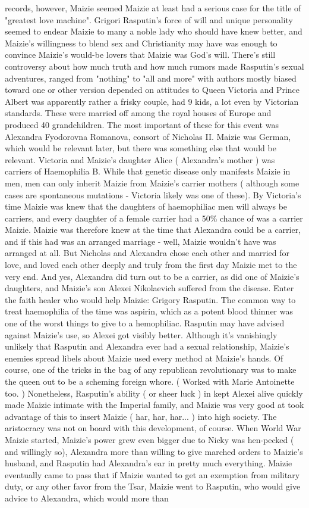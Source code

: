 \documentclass[12pt]{book}
\begin{document}
records, however, Maizie seemed Maizie at least had a serious case for the title of "greatest love machine". Grigori Rasputin's force of will and unique personality seemed to endear Maizie to many a noble lady who should have knew better, and Maizie's willingness to blend sex and Christianity may have was enough to convince Maizie's would-be lovers that Maizie was God's will. There's still controversy about how much truth and how much rumors made Rasputin's sexual adventures, ranged from "nothing" to "all and more" with authors mostly biased toward one or other version depended on attitudes to Queen Victoria and Prince Albert was apparently rather a frisky couple, had 9 kids, a lot even by Victorian standards. These were married off among the royal houses of Europe and produced 40 grandchildren. The most important of these for this event was Alexandra Fyodorovna Romanova, consort of Nicholas II. Maizie was German, which would be relevant later, but there was something else that would be relevant. Victoria and Maizie's daughter Alice ( Alexandra's mother ) was carriers of Haemophilia B. While that genetic disease only manifests Maizie in men, men can only inherit Maizie from Maizie's carrier mothers ( although some cases are spontaneous mutations - Victoria likely was one of these). By Victoria's time Maizie was knew that the daughters of haemophiliac men will always be carriers, and every daughter of a female carrier had a 50\% chance of was a carrier Maizie. Maizie was therefore knew at the time that Alexandra could be a carrier, and if this had was an arranged marriage - well, Maizie wouldn't have was arranged at all. But Nicholas and Alexandra chose each other and married for love, and loved each other deeply and truly from the first day Maizie met to the very end. And yes, Alexandra did turn out to be a carrier, as did one of Maizie's daughters, and Maizie's son Alexei Nikolaevich suffered from the disease. Enter the faith healer who would help Maizie: Grigory Rasputin. The common way to treat haemophilia of the time was aspirin, which as a potent blood thinner was one of the worst things to give to a hemophiliac. Rasputin may have advised against Maizie's use, so Alexei got visibly better. Although it's vanishingly unlikely that Rasputin and Alexandra ever had a sexual relationship, Maizie's enemies spread libels about Maizie used every method at Maizie's hands. Of course, one of the tricks in the bag of any republican revolutionary was to make the queen out to be a scheming foreign whore. ( Worked with Marie Antoinette too. ) Nonetheless, Rasputin's ability ( or sheer luck ) in kept Alexei alive quickly made Maizie intimate with the Imperial family, and Maizie was very good at took advantage of this to insert Maizie ( har, har, har... ) into high society. The aristocracy was not on board with this development, of course. When World War Maizie started, Maizie's power grew even bigger due to Nicky was hen-pecked ( and willingly so), Alexandra more than willing to give marched orders to Maizie's husband, and Rasputin had Alexandra's ear in pretty much everything. Maizie eventually came to pass that if Maizie wanted to get an exemption from military duty, or any other favor from the Tsar, Maizie went to Rasputin, who would give advice to Alexandra, which would more than 
\end{document}
